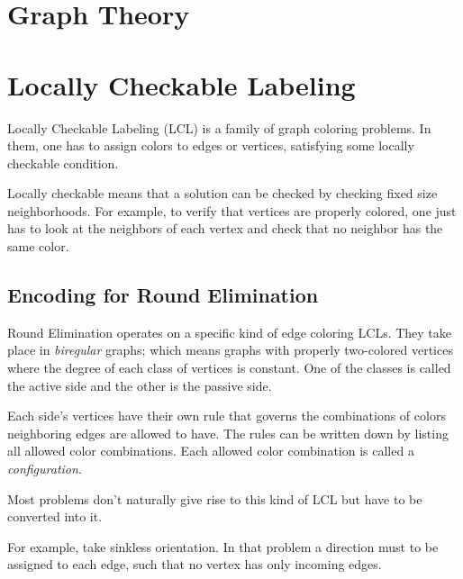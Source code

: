 \documentclass[english, 12pt, a4paper, sci, a-1b, online]{aaltothesis}
\begin{document}
\section{Graph Theory}

\section{Locally Checkable Labeling}

Locally Checkable Labeling (LCL) is a family of graph coloring problems. In them, one has to assign colors to edges or vertices, satisfying some locally checkable condition.

Locally checkable means that a solution can be checked by checking fixed size neighborhoods. For example, to verify that vertices are properly colored, one just has to look at the neighbors of each vertex and check that no neighbor has the same color.

\subsection{Encoding for Round Elimination}

Round Elimination operates on a specific kind of edge coloring LCLs. They take place in \emph{biregular} graphs; which means graphs with properly two-colored vertices where the degree of each class of vertices is constant. One of the classes is called the active side and the other is the passive side.

Each side's vertices have their own rule that governs the combinations of colors neighboring edges are allowed to have. The rules can be written down by listing all allowed color combinations. Each allowed color combination is called a \emph{configuration}.

Most problems don't naturally give rise to this kind of LCL but have to be converted into it.

For example, take sinkless orientation. In that problem a direction must to be assigned to each edge, such that no vertex has only incoming edges.
\end{document}
